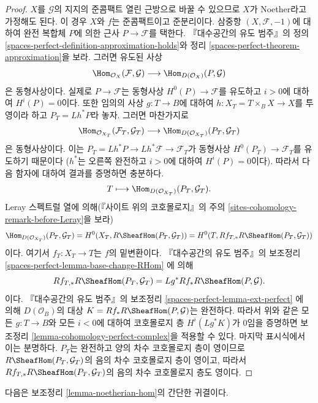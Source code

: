 \begin{proof}
$X$를 $\mathcal{G}$의 지지의 준콤팩트 열린 근방으로 바꿀 수 있으므로
$X$가 Noether라고 가정해도 된다. 이 경우 $X$와 $f$는 준콤팩트이고
준분리이다. 삼중항 $(X, \mathcal{F}, -1)$에 대하여 완전 복합체
$P$에 의한 근사 $P \to \mathcal{F}$를 택한다.
『대수공간의 유도 범주』의 정의
\ref{spaces-perfect-definition-approximation-holds}와 정리
\ref{spaces-perfect-theorem-approximation}을 보라.
그러면 유도된 사상
$$
\Hom_{\mathcal{O}_X}(\mathcal{F}, \mathcal{G})
\longrightarrow
\Hom_{D(\mathcal{O}_X)}(P, \mathcal{G})
$$
은 동형사상이다. 실제로 $P \to \mathcal{F}$는 동형사상
$H^0(P) \to \mathcal{F}$를 유도하고 $i > 0$에 대하여
$H^i(P) = 0$이다. 또한 임의의 사상 $g : T \to B$에 대하여
$h : X_T = T \times_B X \to X$를 투영이라 하고
$P_T = Lh^*P$라 놓자.
그러면 마찬가지로
$$
\Hom_{\mathcal{O}_{X_T}}(\mathcal{F}_T, \mathcal{G}_T)
\longrightarrow
\Hom_{D(\mathcal{O}_{X_T})}(P_T, \mathcal{G}_T)
$$
은 동형사상이다. 이는
$P_T = Lh^*P \to Lh^*\mathcal{F} \to \mathcal{F}_T$가 동형사상
$H^0(P_T) \to \mathcal{F}_T$를 유도하기 때문이다
($h^*$는 오른쪽 완전하고 $i > 0$에 대하여 $H^i(P) = 0$이다).
따라서 다음 함자에 대하여 결과를 증명하면 충분하다.
$$
T \longmapsto \Hom_{D(\mathcal{O}_{X_T})}(P_T, \mathcal{G}_T).
$$
Leray 스펙트럴 열에 의해(『사이트 위의 코호몰로지』의 주의
\ref{sites-cohomology-remark-before-Leray}을 보라)
$$
\Hom_{D(\mathcal{O}_{X_T})}(P_T, \mathcal{G}_T) =
H^0(X_T, R\SheafHom(P_T, \mathcal{G}_T)) =
H^0(T, Rf_{T, *}R\SheafHom(P_T, \mathcal{G}_T))
$$
이다. 여기서 $f_T : X_T \to T$는 $f$의 밑변환이다.
『대수공간의 유도 범주』의 보조정리
\ref{spaces-perfect-lemma-base-change-RHom}
에 의해
$$
Rf_{T, *}R\SheafHom(P_T, \mathcal{G}_T) = Lg^*Rf_*R\SheafHom(P, \mathcal{G}).
$$
이다. 『대수공간의 유도 범주』의 보조정리
\ref{spaces-perfect-lemma-ext-perfect}
에 의해 $D(\mathcal{O}_B)$의 대상
$K = Rf_*R\SheafHom(P, \mathcal{G})$는 완전하다.
따라서 위와 같은 모든 $g : T \to B$와 모든 $i < 0$에 대하여
코호몰로지 층 $H^i(Lg^*K)$가 $0$임을 증명하면
보조정리 \ref{lemma-cohomology-perfect-complex}을 적용할 수 있다.
마지막 표시식에서 이는 분명하다.
$P_T$는 완전하고 양의 차수 코호몰로지 층이 영이므로
$R\SheafHom(P_T, \mathcal{G}_T)$의 음의 차수 코호몰로지 층이 영이고,
따라서 $Rf_{T, *}R\SheafHom(P_T, \mathcal{G}_T)$의 음의 차수
코호몰로지 층도 영이다.
\end{proof}

\noindent
다음은 보조정리 \ref{lemma-noetherian-hom}의 간단한 귀결이다.

